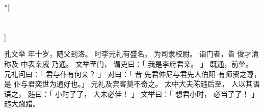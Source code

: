 
\newpage
\switchcolumn[0]*[\section{}]

孔文举
年十岁，随父到洛。
时李元礼有盛名，
为司隶校尉。
诣门者，皆
    俊才清称及
    中表亲戚
乃通。
文举至门，
谓吏曰：「
    我是李府君亲。
」
既通，前坐。
元礼问曰：「
    君与仆有何亲？
」
对曰：「
    昔
    先君仲尼与君先人伯阳
    有师资之尊，
    是
    仆与君奕世为通好也。」
元礼及宾客莫不奇之。
太中大夫陈韪后至，
人以其语语之，
韪曰：「
    小时了了，
    大未必佳！
」
文举曰：「
    想君小时，
    必当了了！
」
韪大踧踖。

\switchcolumn



